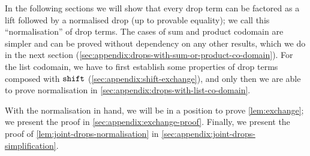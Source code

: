 In the following sections we will show that every drop term can be factored as a lift followed by a normalised drop (up to provable equality); we call this ``normalisation'' of drop terms. The cases of sum and product codomain are simpler and can be proved without dependency on any other results, which we do in the next section (\cref{sec:appendix:drops-with-sum-or-product-co-domain}). For the list codomain, we have to first establish some properties of drop terms composed with $\mathtt{shift}$ (\cref{sec:appendix:shift-exchange}), and only then we are able to prove normalisation in \cref{sec:appendix:drops-with-list-co-domain}. 

With the normalisation in hand, we will be in a position to prove \cref{lem:exchange}; we present the proof in \cref{sec:appendix:exchange-proof}. Finally, we present the proof of \cref{lem:joint-drops-normalisation} in \cref{sec:appendix:joint-drops-simplification}.










